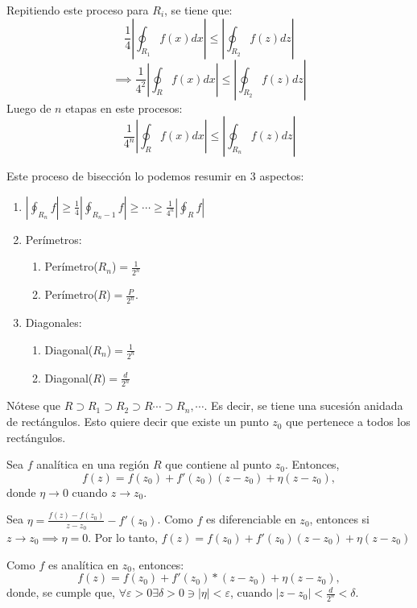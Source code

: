 \begin{dem}
\begin{figure}[H]
\begin{tikzpicture}[x=0.75pt,y=0.75pt,yscale=-1,xscale=1]
\end{tikzpicture}          
        \end{figure}

        Repitiendo este proceso para $R_i$, se tiene que:
        $$\frac{1}{4}\left|\oint_{R_1}f(x)dx\right| \leq \left|\oint_{R_2}f(z)dz\right|$$
        $$\implies \frac{1}{4^2}\left|\oint_{R}f(x)dx\right| \leq \left|\oint_{R_2}f(z)dz\right|$$
        Luego de $n$ etapas en este procesos: 
        $$\frac{1}{4^n}\left|\oint_{R}f(x)dx\right| \leq \left|\oint_{R_n}f(z)dz\right|$$

        Este proceso de bisección lo podemos resumir en 3 aspectos: 
        \begin{enumerate}
            \item $\left|\oint_{R_n}f\right|\geq \frac{1}{4}\left|\oint_{R_n -1}f\right| \geq \cdots \geq \frac{1}{4^n}\left|\oint_R f\right|$
            \item Perímetros:
                \begin{enumerate}
                    \item Perímetro($R_n$)$=\frac{1}{2^n}$
                    \item Perímetro($R$)$=\frac{P}{2^n}$.
                \end{enumerate}
            \item Diagonales: 
            \begin{enumerate}
                \item Diagonal($R_n$)$=\frac{1}{2^n}$
                \item Diagonal($R$)$=\frac{d}{2^n}$
            \end{enumerate}
        \end{enumerate}

        \begin{cajita}
            Nótese que $R\supset R_1\supset R_2\supset R \cdots\supset R_n,\cdots $. Es decir, se tiene una sucesión anidada de rectángulos. Esto quiere decir que existe un punto $z_0$ que pertenece a todos los rectángulos. 
        \end{cajita}

        \begin{cajita}
            \begin{lema}
                Sea $f$ analítica en una región $R$ que contiene al punto $z_0$. Entonces, 
                $$f(z)=f(z_0)+f'(z_0)(z-z_0)+\eta (z-z_0),$$
                donde $\eta\to 0$ cuando $z\to z_0$.
                \begin{dem}
                    Sea $\eta=\frac{f(z)-f(z_0)}{z-z_0}-f'(z_0)$. Como $f$ es diferenciable en $z_0$, entonces si $z\to z_0\implies \eta=0$. Por lo tanto, $f(z)=f(z_0)+f'(z_0)(z-z_0)+\eta(z-z_0)$
                \end{dem}
            \end{lema}
        \end{cajita}
        Como $f$ es analítica en $z_0$, entonces: 
        $$f(z)=f(z_0)+f'(z_0)*(z-z_0)+\eta(z-z_0),$$
        donde, se cumple que, $\forall \varepsilon >0\exists \delta>0\ni |\eta|<\varepsilon$, cuando $|z-z_0|<\frac{d}{2^n}<\delta$. 
        


\end{dem}
